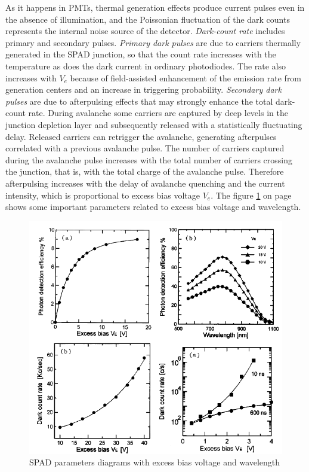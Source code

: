 As it happens in \ac{PMT}s, thermal generation effects produce current pulses even in the absence of illumination, and the Poissonian fluctuation of the dark counts represents the internal noise source of the detector. \textit{Dark-count rate} includes primary and secondary pulses. \textit{Primary dark pulses} are due to carriers thermally generated in the \acs{SPAD} junction, so that the count rate increases with the temperature as does the dark current in ordinary photodiodes. The rate also increases with $V_e$ because of field-assisted enhancement of the emission rate from generation centers and an increase in triggering probability. \textit{Secondary dark pulses} are due to afterpulsing effects that may strongly enhance the total dark-count rate. During avalanche some carriers are captured by deep levels in the junction depletion layer and subsequently released with a statistically fluctuating delay. Released carriers can retrigger the avalanche, generating afterpulses correlated with a previous avalanche pulse. The number of carriers captured during the avalanche pulse increases with the total number of carriers crossing the junction, that is, with the total charge of the avalanche pulse. Therefore afterpulsing increases with the delay of avalanche quenching and the current intensity, which is proportional to excess bias voltage $V_e$. The figure \ref{spad_para} on page \pageref{spad_para} shows some important parameters related to excess bias voltage and wavelength.

\begin{figure} [ht]
\centering
\includegraphics[scale=0.8]{chapters/img/SPAD_Ve_functions.png}	
\caption{\acs{SPAD} parameters diagrams with excess bias voltage and wavelength}
\label{spad_para}
\end{figure}

